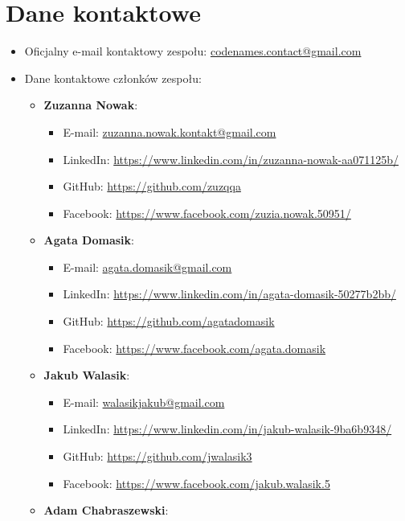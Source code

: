 \documentclass[12pt,a4paper]{book}
\begin{document}
\section{Dane kontaktowe}
\begin{itemize}
    \item Oficjalny e-mail kontaktowy zespołu: 
    \href{mailto:codenames.contact@gmail.com}{codenames.contact@gmail.com}
    \item Dane kontaktowe członków zespołu:
    \begin{itemize}
        \item \textbf{Zuzanna Nowak}:
        \begin{itemize}
            \item E-mail: \href{mailto:zuzanna.nowak.kontakt@gmail.com}{zuzanna.nowak.kontakt@gmail.com} 
            \item LinkedIn: \url{https://www.linkedin.com/in/zuzanna-nowak-aa071125b/} 
            \item GitHub: \url{https://github.com/zuzqqa}
            \item Facebook: \url{https://www.facebook.com/zuzia.nowak.50951/}
        \end{itemize}
        \item \textbf{Agata Domasik}:
        \begin{itemize}
            \item E-mail: \href{mailto:agata.domasik@gmail.com}{agata.domasik@gmail.com} 
            \item LinkedIn: \url{https://www.linkedin.com/in/agata-domasik-50277b2bb/}
            \item GitHub: \url{https://github.com/agatadomasik}
            \item Facebook: \url{https://www.facebook.com/agata.domasik}
        \end{itemize}
        \item \textbf{Jakub Walasik}:
        \begin{itemize}
            \item E-mail: \href{mailto:walasikjakub@gmail.com}{walasikjakub@gmail.com}  
            \item LinkedIn: \url{https://www.linkedin.com/in/jakub-walasik-9ba6b9348/}
            \item GitHub: \url{https://github.com/jwalasik3}
            \item Facebook: \url{https://www.facebook.com/jakub.walasik.5}
        \end{itemize}
        \item \textbf{Adam Chabraszewski}:

\end{itemize}
\end{itemize}
\end{document}
